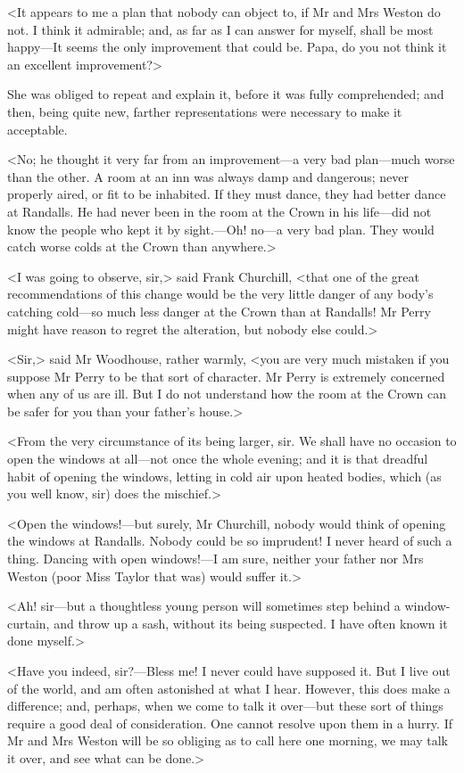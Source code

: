<It appears to me a plan that nobody can object to, if Mr and Mrs Weston do not. I think it admirable; and, as far as I can answer for myself, shall be most happy—It seems the only improvement that could be. Papa, do you not think it an excellent improvement?>

She was obliged to repeat and explain it, before it was fully comprehended; and then, being quite new, farther representations were necessary to make it acceptable.

<No; he thought it very far from an improvement—a very bad plan—much worse than the other. A room at an inn was always damp and dangerous; never properly aired, or fit to be inhabited. If they must dance, they had better dance at Randalls. He had never been in the room at the Crown in his life—did not know the people who kept it by sight.—Oh! no—a very bad plan. They would catch worse colds at the Crown than anywhere.>

<I was going to observe, sir,> said Frank Churchill, <that one of the great recommendations of this change would be the very little danger of any body's catching cold—so much less danger at the Crown than at Randalls! Mr Perry might have reason to regret the alteration, but nobody else could.>

<Sir,> said Mr Woodhouse, rather warmly, <you are very much mistaken if you suppose Mr Perry to be that sort of character. Mr Perry is extremely concerned when any of us are ill. But I do not understand how the room at the Crown can be safer for you than your father's house.>

<From the very circumstance of its being larger, sir. We shall have no occasion to open the windows at all—not once the whole evening; and it is that dreadful habit of opening the windows, letting in cold air upon heated bodies, which (as you well know, sir) does the mischief.>

<Open the windows!—but surely, Mr Churchill, nobody would think of opening the windows at Randalls. Nobody could be so imprudent! I never heard of such a thing. Dancing with open windows!—I am sure, neither your father nor Mrs Weston (poor Miss Taylor that was) would suffer it.>

<Ah! sir—but a thoughtless young person will sometimes step behind a window-curtain, and throw up a sash, without its being suspected. I have often known it done myself.>

<Have you indeed, sir?—Bless me! I never could have supposed it. But I live out of the world, and am often astonished at what I hear. However, this does make a difference; and, perhaps, when we come to talk it over—but these sort of things require a good deal of consideration. One cannot resolve upon them in a hurry. If Mr and Mrs Weston will be so obliging as to call here one morning, we may talk it over, and see what can be done.>

